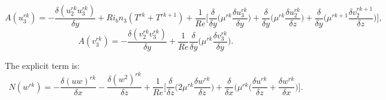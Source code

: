 \documentclass[preprint,12pt]{article}
\begin{document}
\begin{equation}
A(u_3^{rk})=-\frac{\delta (u_2^{rk}u_3^{rk})}{\delta y}+Ri_b n_3
({{T}}^{rk}+{{T}}^{rk+1})+\frac{1}{Re}\Bigg[\frac{\delta}{\delta y}\Big(\mu^{rk}\frac{\delta u_3^{rk}}{\delta y}\Big)+\frac{\delta }{\delta y}\Big(\mu^{rk}\frac{\delta u_2^{rk}}{\delta z}\Big)+\frac{\delta }{\delta y}\Big(\mu^{rk+1}\frac{\delta v_2^{rk+1}}{\delta z}\Big)\Bigg],
\end{equation}
\begin{equation}
{A}(v_3^{rk})=-\frac{\delta (v_2^{rk}v_3^{rk})}{\delta y}+\frac{1}{Re}\frac{\delta}{\delta y}\Big(\mu^{rk}\frac{\delta v_3^{rk}}{\delta y}\Big).
\end{equation}

The explicit term is: 
\begin{equation}
N(w^{rk})=-\frac{\delta {(uw)}^{rk}}{\delta x}-\frac{\delta {(w^2)}^{rk}}{\delta z} +\frac{1}{Re}\Bigg[\frac{\delta}{\delta z}\Big({2\mu^{rk}}\frac{\delta w^{rk}}{\delta z}\Big)+\frac{\delta }{\delta x}\Big({{\mu^{rk}}}\Big(\frac{\delta u^{rk}}{\delta z} + \frac{\delta w^{rk}}{\delta x}\Big)\Bigg].
\end{equation}

\end{document}
